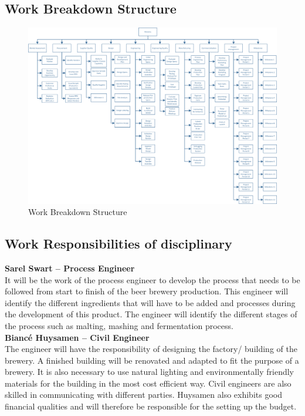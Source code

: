 \begin{landscape}

\subsection{Work Breakdown Structure}

\begin{figure}[H]
\centering
\includegraphics[scale=0.8]{WBS.png}
%
\caption{Work Breakdown Structure}
\label{fig:wbs}
\end{figure}

\end{landscape}

\subsection{Work Responsibilities of disciplinary}

\textbf{Sarel Swart – Process Engineer}\\
\noindent
It will be the work of the process engineer to develop the process that needs to be followed from start to finish of the beer brewery production. This engineer will identify the different ingredients that will have to be added and processes during the development of this product. The engineer will identify the different stages of the process such as malting, mashing and fermentation process.\\

\noindent
\textbf{Biancé Huysamen – Civil Engineer}\\
\noindent
The engineer will have the responsibility of designing the factory/ building of the brewery. A finished building will be renovated and adapted to fit the purpose of a brewery. It is also necessary to use natural lighting and environmentally friendly materials for the building in the most cost efficient way. Civil engineers are also skilled in communicating with different parties. Huysamen also exhibits good financial qualities and will therefore be responsible for the setting up the budget.\\

